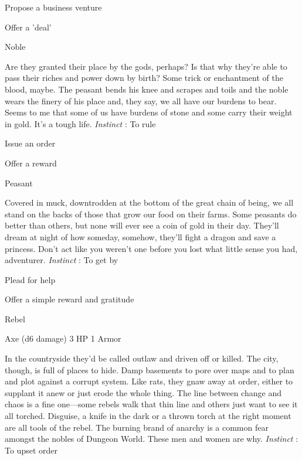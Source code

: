 \startitemize[1,packed]

\item Propose a business venture

 
\item Offer a 'deal'


\stopitemize
 
\startMonsterName
Noble	
\stopMonsterName
 
\startMonsterDescription
Are they granted their place by the gods, perhaps? Is that why they’re able to pass their riches and power down by birth? Some trick or enchantment of the blood, maybe. The peasant bends his knee and scrapes and toils and the noble wears the finery of his place and, they say, we all have our burdens to bear. Seems to me that some of us have burdens of stone and some carry their weight in gold. It’s a tough life. {\em Instinct} : To rule
\stopMonsterDescription
 
\startitemize[1,packed]

\item Issue an order

 
\item Offer a reward


\stopitemize
 
\startMonsterName
Peasant	
\stopMonsterName
 
\startMonsterDescription
Covered in muck, downtrodden at the bottom of the great chain of being, we all stand on the backs of those that grow our food on their farms. Some peasants do better than others, but none will ever see a coin of gold in their day. They’ll dream at night of how someday, somehow, they’ll fight a dragon and save a princess. Don’t act like you weren’t one before you lost what little sense you had, adventurer. {\em Instinct} : To get by
\stopMonsterDescription
 
\startitemize[1,packed]

\item Plead for help

 
\item Offer a simple reward and gratitude


\stopitemize
 
\startMonsterName
Rebel	 
\stopMonsterName
 

Axe (d6 damage)	3 HP	1 Armor

 


 
\startMonsterDescription
In the countryside they’d be called outlaw and driven off or killed. The city, though, is full of places to hide. Damp basements to pore over maps and to plan and plot against a corrupt system. Like rats, they gnaw away at order, either to supplant it anew or just erode the whole thing. The line between change and chaos is a fine one—some rebels walk that thin line and others just want to see it all torched. Disguise, a knife in the dark or a thrown torch at the right moment are all tools of the rebel. The burning brand of anarchy is a common fear amongst the nobles of Dungeon World. These men and women are why. {\em Instinct} : To upset order
\stopMonsterDescription
 
